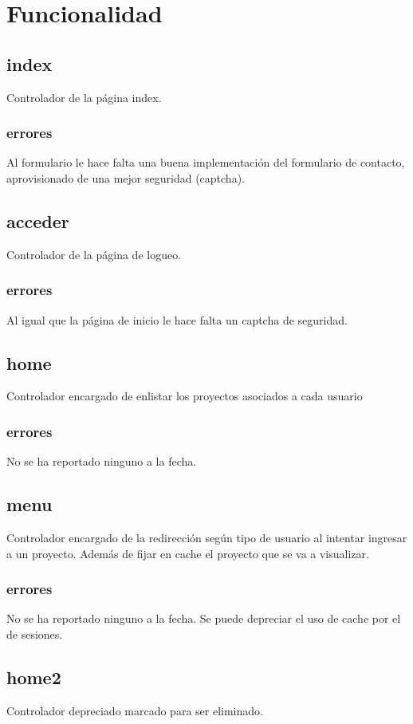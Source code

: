 \documentclass[10pt,a4paper]{book}
\begin{document}
	\section{Funcionalidad}

	\subsection{index}
	Controlador de la página index.

	\subsubsection{errores} Al formulario le hace falta una buena implementación del formulario de contacto, aprovisionado de una mejor seguridad (captcha).


	\subsection{acceder}
	Controlador de la página de logueo.

	\subsubsection{errores}
	Al igual que la página de inicio le hace falta un captcha de seguridad.

	\subsection{home}
	Controlador encargado de enlistar los proyectos asociados a cada usuario
	\subsubsection{errores}
	No se ha reportado ninguno a la fecha.

	\subsection{menu}
	Controlador encargado de la redirección según tipo de usuario al intentar ingresar a un proyecto. Además de fijar en cache el proyecto que se va a visualizar.
	\subsubsection{errores}
	No se ha reportado ninguno a la fecha. Se puede depreciar el uso de cache por el de sesiones.

	\subsection{home2}
	Controlador depreciado marcado para ser eliminado.
\end{document}
